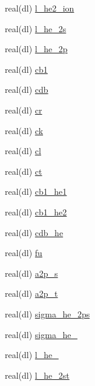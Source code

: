 \begin{DoxyCompactItemize}
\item 
real(dl) \mbox{\hyperlink{namespacerecdata_a09a8999d2bef3fe3af6c0216cb534b5d}{l\+\_\+he2\+\_\+ion}}
\item 
real(dl) \mbox{\hyperlink{namespacerecdata_a92c403d880fb9d689ce3cd14be2a9419}{l\+\_\+he\+\_\+2s}}
\item 
real(dl) \mbox{\hyperlink{namespacerecdata_a2be433bb2e316e0518793af163f2d5ce}{l\+\_\+he\+\_\+2p}}
\item 
real(dl) \mbox{\hyperlink{namespacerecdata_a7e7a0ff371efd261f699832dc5f2d2a4}{cb1}}
\item 
real(dl) \mbox{\hyperlink{namespacerecdata_a0b6cc26e2d2688842af68cd27723b349}{cdb}}
\item 
real(dl) \mbox{\hyperlink{namespacerecdata_a8ab4f6bed512cd3707c9ee47b17b888c}{cr}}
\item 
real(dl) \mbox{\hyperlink{namespacerecdata_aba2f0c8512427aa917fc8cac8bc0ec4e}{ck}}
\item 
real(dl) \mbox{\hyperlink{namespacerecdata_ab68a51a351429e593781556b05330c60}{cl}}
\item 
real(dl) \mbox{\hyperlink{namespacerecdata_a5b074d69ad1a7e5c8ec138af8ca09905}{ct}}
\item 
real(dl) \mbox{\hyperlink{namespacerecdata_a0632faea1d88dcd7d279c24c08910ed3}{cb1\+\_\+he1}}
\item 
real(dl) \mbox{\hyperlink{namespacerecdata_af94354830fdc5a327a28087bff0bff81}{cb1\+\_\+he2}}
\item 
real(dl) \mbox{\hyperlink{namespacerecdata_a158d229f115a9b6b137ba43b674bf626}{cdb\+\_\+he}}
\item 
real(dl) \mbox{\hyperlink{namespacerecdata_a29419b5fe5c4de5d80938025601d4eb9}{fu}}
\item 
real(dl) \mbox{\hyperlink{namespacerecdata_ab0a23c356e59d53950e7536cf79fe3cd}{a2p\+\_\+s}}
\item 
real(dl) \mbox{\hyperlink{namespacerecdata_a34c7f7e2605d273b585ab3de74345d16}{a2p\+\_\+t}}
\item 
real(dl) \mbox{\hyperlink{namespacerecdata_af22595aa05fb59f5a5b0b8d55c3c5125}{sigma\+\_\+he\+\_\+2ps}}
\item 
real(dl) \mbox{\hyperlink{namespacerecdata_a5d432a7f8ed1a614dbc48413e8c4540a}{sigma\+\_\+he\+\_\+2pt}}
\item 
real(dl) \mbox{\hyperlink{namespacerecdata_a0961b37240c725eeb78661e93ed840d5}{l\+\_\+he\+\_\+2pt}}
\item 
real(dl) \mbox{\hyperlink{namespacerecdata_a3c04537ed51f41795d984b8796437d62}{l\+\_\+he\+\_\+2st}}

\end{DoxyCompactItemize}
